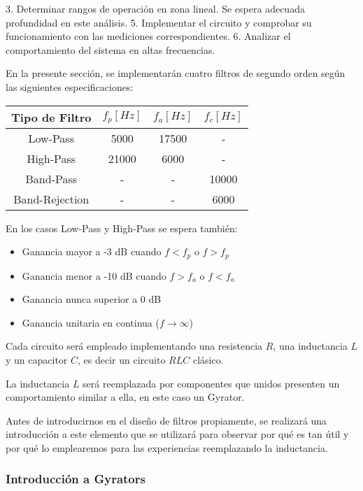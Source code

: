 3. Determinar rangos de operación en zona lineal. Se espera adecuada profundidad en este análisis.
5. Implementar el circuito y comprobar su funcionamiento con las mediciones correspondientes.
6. Analizar el comportamiento del sistema en altas frecuencias.

En la presente sección, se implementarán cuatro filtros de segundo orden según las siguientes especificaciones:

\begin{table}[H]
    \centering
    \begin{tabular}{|c|c|c|c|}
    \hline
    \rowcolor[HTML]{C0C0C0} 
    Tipo de Filtro & $f_p[Hz]$ & $f_a[Hz]$ & $f_c[Hz]$ \\ \hline
    Low-Pass       & 5000   & 17500  & -      \\ \hline
    High-Pass      & 21000   & 6000   & -      \\ \hline
    Band-Pass      & -      & -      & 10000  \\ \hline
    Band-Rejection & -      & -      & 6000   \\ \hline
    \end{tabular}
    \end{table}

En los casos Low-Pass y High-Pass se espera también:

\begin{itemize}
	\item Ganancia mayor a -3 dB cuando $f < f_p$ o $f > f_p$ 
	\item Ganancia menor a -10 dB cuando $f > f_a$ o $f < f_a$
	\item Ganancia nunca superior a 0 dB
	\item Ganancia unitaria en continua ($f \to \infty$)
\end{itemize}

Cada circuito será empleado implementando una resistencia $R$, una inductancia $L$ y un capacitor $C$, es decir un circuito $RLC$
clásico. 

La inductancia $L$ será reemplazada por componentes que unidos presenten un comportamiento similar a ella, en este caso
un Gyrator. 

Antes de introducirnos en el diseño de filtros propiamente, se realizará una introducción a este elemento que se utilizará para observar
por qué es tan útil y por qué lo emplearemos para las experiencias reemplazando la inductancia.

\subsubsection{Introducción a Gyrators}

